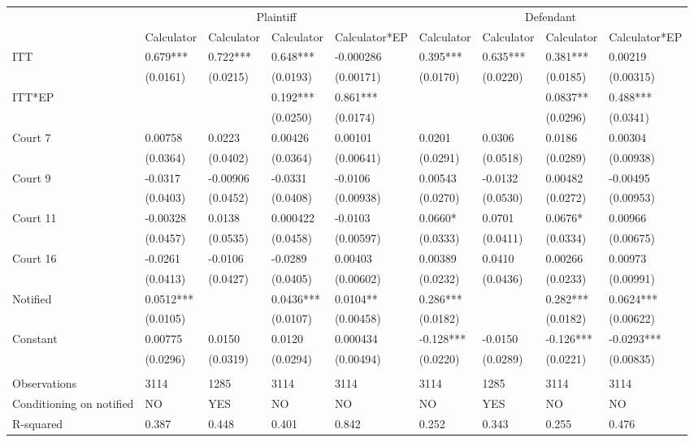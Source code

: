 \begin{tabular}{lllllllll}
\cmidrule{2-9}\multicolumn{1}{r|}{} & \multicolumn{4}{c|}{Plaintiff} & \multicolumn{4}{c|}{Defendant} \\
\cmidrule{2-9}      & \multicolumn{1}{c}{Calculator} & \multicolumn{1}{c}{Calculator} & \multicolumn{1}{c}{Calculator} & \multicolumn{1}{c}{Calculator*EP} & \multicolumn{1}{c}{Calculator} & \multicolumn{1}{c}{Calculator} & \multicolumn{1}{c}{Calculator} & \multicolumn{1}{c}{Calculator*EP} \\
\cmidrule{2-9}ITT   & 0.679*** & 0.722*** & 0.648*** & -0.000286 & 0.395*** & 0.635*** & 0.381*** & 0.00219 \\
      & (0.0161) & (0.0215) & (0.0193) & (0.00171) & (0.0170) & (0.0220) & (0.0185) & (0.00315) \\
ITT*EP &       &       & 0.192*** & 0.861*** &       &       & 0.0837** & 0.488*** \\
      &       &       & (0.0250) & (0.0174) &       &       & (0.0296) & (0.0341) \\
Court 7 & 0.00758 & 0.0223 & 0.00426 & 0.00101 & 0.0201 & 0.0306 & 0.0186 & 0.00304 \\
      & (0.0364) & (0.0402) & (0.0364) & (0.00641) & (0.0291) & (0.0518) & (0.0289) & (0.00938) \\
Court 9 & -0.0317 & -0.00906 & -0.0331 & -0.0106 & 0.00543 & -0.0132 & 0.00482 & -0.00495 \\
      & (0.0403) & (0.0452) & (0.0408) & (0.00938) & (0.0270) & (0.0530) & (0.0272) & (0.00953) \\
Court 11 & -0.00328 & 0.0138 & 0.000422 & -0.0103 & 0.0660* & 0.0701 & 0.0676* & 0.00966 \\
      & (0.0457) & (0.0535) & (0.0458) & (0.00597) & (0.0333) & (0.0411) & (0.0334) & (0.00675) \\
Court 16 & -0.0261 & -0.0106 & -0.0289 & 0.00403 & 0.00389 & 0.0410 & 0.00266 & 0.00973 \\
      & (0.0413) & (0.0427) & (0.0405) & (0.00602) & (0.0232) & (0.0436) & (0.0233) & (0.00991) \\
Notified & 0.0512*** &       & 0.0436*** & 0.0104** & 0.286*** &       & 0.282*** & 0.0624*** \\
      & (0.0105) &       & (0.0107) & (0.00458) & (0.0182) &       & (0.0182) & (0.00622) \\
Constant  & 0.00775 & 0.0150 & 0.0120 & 0.000434 & -0.128*** & -0.0150 & -0.126*** & -0.0293*** \\
      & (0.0296) & (0.0319) & (0.0294) & (0.00494) & (0.0220) & (0.0289) & (0.0221) & (0.00835) \\
      &       &       &       &       &       &       &       &  \\
\midrule
Observations & 3114  & 1285  & 3114  & 3114  & 3114  & 1285  & 3114  & 3114 \\
Conditioning on notified & NO    & YES   & NO    & NO    & NO    & YES   & NO    & NO \\
R-squared & 0.387 & 0.448 & 0.401 & 0.842 & 0.252 & 0.343 & 0.255 & 0.476 \\
\bottomrule
\bottomrule
\end{tabular}%
